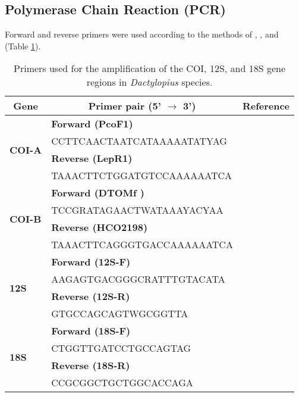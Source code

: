 \subsection{Polymerase Chain Reaction (PCR)}

Forward and reverse primers were used according to the methods of
\citet{Park2010RecoveryPrimers}, \citet{Campana2015}, and \citet{Mathenge2015} (Table \ref{tab:primers}). 

\vspace{0.5cm}

\begin{table}[H]
\renewcommand{\arraystretch}{0.6}
\centering
\caption{Primers used for the amplification of the COI, 12S, and 18S gene regions in \textit{Dactylopius} species.} 
\label{tab:primers} 
\begin{tabular}{@{}lll@{}}
\toprule
\multicolumn{1}{c}{\textbf{Gene}} & \multicolumn{1}{c}{\textbf{Primer pair (5' $\rightarrow$ 3')}} & \multicolumn{1}{c}{\textbf{Reference}} \\ \midrule
\multirow{4}{*}{\textbf{COI-A}} & \textbf{Forward (PcoF1)} & \citet{Park2010RecoveryPrimers} \\
 & CCTTCAACTAATCATAAAAATATYAG &  \\
 & \textbf{Reverse (LepR1)} &  \\
 & TAAACTTCTGGATGTCCAAAAAATCA &  \\ \hline
\multirow{4}{*}{\textbf{COI-B}} & \textbf{Forward (DTOMf )} & \citet{Mathenge2015} \\
 & TCCGRATAGAACTWATAAAYACYAA &  \\
 & \textbf{Reverse (HCO2198)} &  \\
 & TAAACTTCAGGGTGACCAAAAAATCA &  \\ \hline
\multirow{4}{*}{\textbf{12S}} & \textbf{Forward (12S-F)} & \citet{Campana2015} \\
 & AAGAGTGACGGGCRATTTGTACATA &  \\
 & \textbf{Reverse (12S-R)} &  \\
 & GTGCCAGCAGTWGCGGTTA &  \\ \hline
\multirow{4}{*}{\textbf{18S}} & \textbf{Forward (18S-F)} & \citet{Campana2015} \\
 & CTGGTTGATCCTGCCAGTAG &  \\
 & \textbf{Reverse (18S-R)} &  \\
 & CCGCGGCTGCTGGCACCAGA &  \\ \bottomrule 
\end{tabular}
\end{table}

